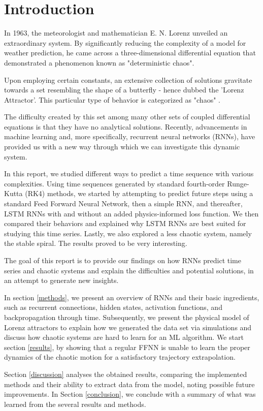 \section{Introduction}\label{introduction}

In 1963, the meteorologist and mathematician E. N. Lorenz unveiled an extraordinary system. By significantly reducing the complexity of a model for weather prediction, he came across a three-dimensional differential equation that demonstrated a phenomenon known as "deterministic chaos".

Upon employing certain constants, an extensive collection of solutions gravitate towards a set resembling the shape of a butterfly - hence dubbed the 'Lorenz Attractor'. This particular type of behavior is categorized as "chaos" \cite{zhang2022}.

The difficulty created by this set among many other sets of coupled differential equations is that they have no analytical solutions. Recently, advancements in machine learning and, more specifically, recurrent neural networks (RNNs), have provided us with a new way through which we can investigate this dynamic system.

In this report, we studied different ways to predict a time sequence with various complexities. Using time sequences generated by standard fourth-order Runge-Kutta (RK4) methods, we started by attempting to predict future steps using a standard Feed Forward Neural Network, then a simple RNN, and thereafter, LSTM RNNs with and without an added physics-informed loss function. We then compared their behaviors and explained why LSTM RNNs are best suited for studying this time series. Lastly, we also explored a less chaotic system, namely the stable spiral. The results proved to be very interesting.

The goal of this report is to provide our findings on how RNNs predict time series and chaotic systems and explain the difficulties and potential solutions, in an attempt to generate new insights.

In section \ref{methods}, we present an overview of RNNs and their basic ingredients, such as recurrent connections, hidden states, activation functions, and backpropagation through time. Subsequently, we present the physical model of Lorenz attractors to explain how we generated the data set via simulations and discuss how chaotic systems are hard to learn for an ML algorithm. We start section \ref{results}, by showing that a regular FFNN is unable to learn the proper dynamics of the chaotic motion for a satisfactory trajectory extrapolation.

Section \ref{discussion} analyses the obtained results, comparing the implemented methods and their ability to extract data from the model, noting possible future improvements.
In Section \ref{conclusion}, we conclude with a summary of what was learned from the several results and methods. 


